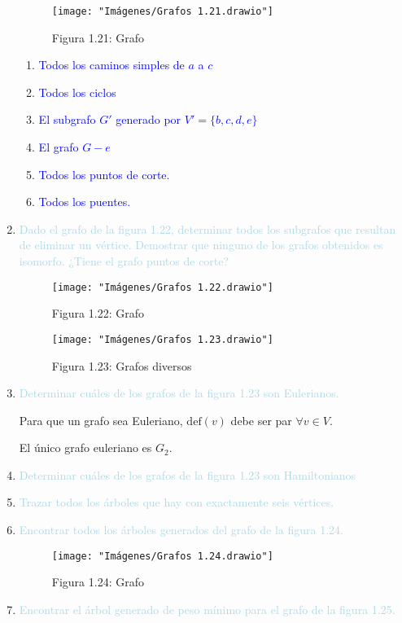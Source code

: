 \documentclass[12pt]{article}
\newcommand{\lb}[1]{\textcolor{lightblue}{#1}}
\newcommand{\db}[1]{\textcolor{blue}{#1}}
\begin{document}
\begin{enumerate}[label=\color{red}\textbf{\arabic*)},leftmargin=*]
	\begin{figure}[h]
		\centering
		\texttt{[image: "Imágenes/Grafos 1.21.drawio"]}
		\caption*{Figura 1.21: Grafo}
	\end{figure}
	\begin{enumerate}[label=\color{red}\alph*)]
		\item \db{Todos los caminos simples de $a$ a $c$}
		\item \db{Todos los ciclos}
		\item \db{El subgrafo $G'$ generado por $V'=\{b,c,d,e\}$}
		\item \db{El grafo $G-e$}
		\item \db{Todos los puntos de corte.}
		\item \db{Todos los puentes.}
	\end{enumerate}
	\item \lb{Dado  el grafo de la figura 1.22, determinar todos los subgrafos que resultan de eliminar un vértice. Demostrar que ninguno de los grafos obtenidos es isomorfo. ¿Tiene el grafo puntos de corte?}
	\begin{figure}[h]
		\centering
		\texttt{[image: "Imágenes/Grafos 1.22.drawio"]}
		\caption*{Figura 1.22: Grafo}
	\end{figure}
	
	\begin{figure}[h]
		\centering
		\texttt{[image: "Imágenes/Grafos 1.23.drawio"]}
		\caption*{Figura 1.23: Grafos diversos}
	\end{figure}
	\item \lb{Determinar cuáles de los grafos de la figura 1.23 son Eulerianos.}
    
    Para que un grafo sea Euleriano, $\mathrm{def}(v)$ debe ser par $\forall v\in V$.
    
    El único grafo euleriano es $G_2$.
	\item \lb{Determinar cuáles de los grafos de la figura 1.23 son Hamiltonianos}
	\item \lb{Trazar todos los árboles que hay con exactamente seis vértices.}
	\item \lb{Encontrar todos los árboles generados del grafo de la figura 1.24.}
	
	\begin{figure}[h]
		\centering
		\texttt{[image: "Imágenes/Grafos 1.24.drawio"]}
		\caption*{Figura 1.24: Grafo}
	\end{figure}
	\item \lb{Encontrar el árbol generado de peso mínimo para el grafo de la figura 1.25.}
	

\end{enumerate}
\end{document}
